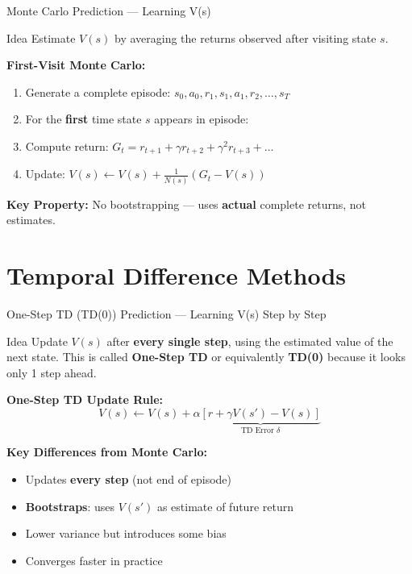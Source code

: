 \documentclass[aspectratio=169]{beamer}
\begin{document}
\begin{frame}{Monte Carlo Prediction — Learning V(s)}
    \begin{block}{Idea}
        Estimate $V(s)$ by averaging the returns observed after visiting state $s$.
    \end{block}

    \vspace{0.3cm}

    \textbf{First-Visit Monte Carlo:}
    \begin{enumerate}
        \item Generate a complete episode: $s_0, a_0, r_1, s_1, a_1, r_2, \dots, s_T$
        \item For the \textbf{first} time state $s$ appears in episode:
        \item Compute return: $G_t = r_{t+1} + \gamma r_{t+2} + \gamma^2 r_{t+3} + \dots$
        \item Update: $V(s) \leftarrow V(s) + \frac{1}{N(s)}(G_t - V(s))$
    \end{enumerate}

    \vspace{0.3cm}

    \textbf{Key Property:} No bootstrapping — uses \textbf{actual} complete returns, not estimates.
\end{frame}

\section{Temporal Difference Methods}

\begin{frame}{One-Step TD (TD(0)) Prediction --- Learning V(s) Step by Step}
    \begin{block}{Idea}
        Update $V(s)$ after \textbf{every single step}, using the estimated value of the next state. This is called \textbf{One-Step TD} or equivalently \textbf{TD(0)} because it looks only 1 step ahead.
    \end{block}

    \vspace{0.3cm}

    \textbf{One-Step TD Update Rule:}
    \[V(s) \leftarrow V(s) + \alpha \underbrace{[r + \gamma V(s') - V(s)]}_{\text{TD Error } \delta}\]

    \vspace{0.3cm}

    \textbf{Key Differences from Monte Carlo:}
    \begin{itemize}
        \item Updates \textbf{every step} (not end of episode)
        \item \textbf{Bootstraps}: uses $V(s')$ as estimate of future return
        \item Lower variance but introduces some bias
        \item Converges faster in practice
    \end{itemize}
\end{frame}
\end{document}
